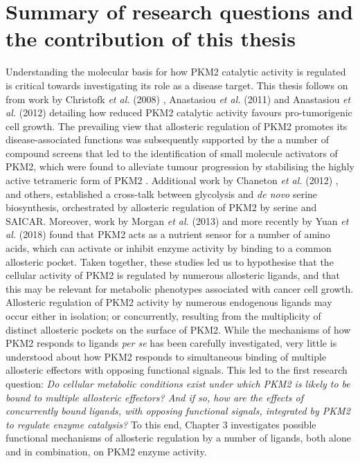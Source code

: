 \section{Summary of research questions and the contribution of this thesis}
Understanding the molecular basis for how PKM2 catalytic activity is regulated is critical towards investigating its role as a disease target. This thesis follows on from work by Christofk \textit{et al.} (2008) \cite{Christofk:2008ab}, Anastasiou \textit{et al.} (2011) \cite{Anastasiou:2011aa} and Anastasiou \textit{et al.} (2012) \cite{Anastasiou:2012aa} detailing how reduced PKM2 catalytic activity favours pro-tumorigenic cell growth. The prevailing view that allosteric regulation of PKM2 promotes its disease-associated functions was subsequently supported by the a number of compound screens that led to the identification of small molecule activators of PKM2, which were found to alleviate tumour progression by stabilising the highly active tetrameric form of PKM2 \cite{Anastasiou:2012aa}. Additional work by Chaneton \textit{et al.} (2012) \cite{Chaneton:2012aa}, and others, established a cross-talk between glycolysis and \textit{de novo} serine biosynthesis, orchestrated by allosteric regulation of PKM2 by serine and SAICAR. Moreover, work by Morgan \textit{et al.} (2013) \cite{Morgan:2013aa} and more recently by Yuan \textit{et al.} (2018) \cite{Yuan:2018aa} found that PKM2 acts as a nutrient sensor for a number of amino acids, which can activate or inhibit enzyme activity by binding to a common allosteric pocket. Taken together, these studies led us to hypothesise that the cellular activity of PKM2 is regulated by numerous allosteric ligands, and that this may be relevant for metabolic phenotypes associated with cancer cell growth. Allosteric regulation of PKM2 activity by numerous endogenous ligands may occur either in isolation; or concurrently, resulting from the multiplicity of distinct allosteric pockets on the surface of PKM2. While the mechanisms of how PKM2 responds to ligands \textit{per se} has been carefully investigated, very little is understood about how PKM2 responds to simultaneous binding of multiple allosteric effectors with opposing functional signals. This led to the first research question: \textit{Do cellular metabolic conditions exist under which PKM2 is likely to be bound to multiple allosteric effectors? And if so, how are the effects of concurrently bound ligands, with opposing functional signals, integrated by PKM2 to regulate enzyme catalysis?} To this end, Chapter 3 investigates possible functional mechanisms of allosteric regulation by a number of ligands, both alone and in combination, on PKM2 enzyme activity. 
